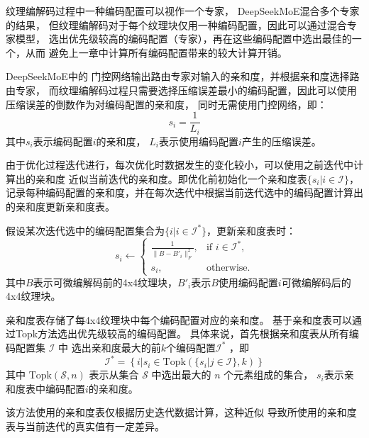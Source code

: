 纹理编解码过程中一种编码配置可以视作一个专家，
DeepSeekMoE\cite{dai2024deepseekmoe}混合多个专家的结果，
但纹理编解码对于每个纹理块仅用一种编码配置，因此可以通过混合专家模型，
选出优先级较高的编码配置（专家），再在这些编码配置中选出最佳的一个，从而
避免上一章中计算所有编码配置带来的较大计算开销。

DeepSeekMoE\cite{dai2024deepseekmoe}中的
门控网络输出路由专家对输入的亲和度，并根据亲和度选择路由专家，
而纹理编解码过程只需要选择压缩误差最小的编码配置，因此可以使用压缩误差的倒数作为对编码配置的亲和度，
同时无需使用门控网络，即：
\begin{equation}
s_i=\frac{1}{L_i}
\end{equation}
其中$s_i$表示编码配置$i$的亲和度，
$L_i$表示使用编码配置$i$产生的压缩误差。

由于优化过程迭代进行，每次优化时数据发生的变化较小，可以使用之前迭代中计算出的亲和度
近似当前迭代的亲和度。即优化前初始化一个亲和度表$\{s_i|i\in\mathcal{I}\}$，
记录每种编码配置的亲和度，并在每次迭代中根据当前迭代选中的编码配置计算出的亲和度更新亲和度表。

假设某次迭代选中的编码配置集合为$\{i|i\in\mathcal{I}^*\}$，更新亲和度表时：
\begin{equation}
    s_i\leftarrow
    \begin{cases} 
    \frac{1}{\|B-B'_i\|_F^2}, & \text{if } i\in\mathcal{I}^*,\\
    s_i, & \text{otherwise}.
    \end{cases}
\end{equation}
其中$B$表示可微编解码前的4x4纹理块，$B'_i$表示$B$使用编码配置$i$可微编解码后的4x4纹理块。

亲和度表存储了每4x4纹理块中每个编码配置对应的亲和度。
基于亲和度表可以通过Topk方法选出优先级较高的编码配置。
具体来说，首先根据亲和度表从所有编码配置集 $\mathcal{I}$ 中
选出亲和度最大的前$k$个编码配置$\mathcal{I}^*$ ，即
\begin{equation}
\label{eq41}
\mathcal{I}^*=\left\{i|s_i\in\text{Topk}(\{s_i|j\in\mathcal{I}\},k)\right\}
\end{equation}
其中 $\text{Topk}(\mathcal{S},n)$ 表示从集合 $\mathcal{S}$ 中选出最大的 $n$ 个元素组成的集合，
$s_i$表示亲和度表中编码配置$i$的亲和度。

该方法使用的亲和度表仅根据历史迭代数据计算，这种近似
导致所使用的亲和度表与当前迭代的真实值有一定差异。

